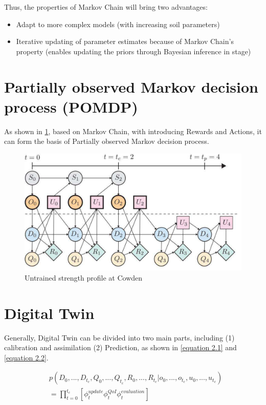   Thus, the properties of Markov Chain will bring two advantages: 

  \begin{itemize}
      \item Adapt to more complex models (with increasing soil parameters)
      \item Iterative updating of parameter estimates because of Markov Chain’s property (enables  updating the priors through Bayesian inference in stage)

  \end{itemize}


  \section{Partially observed Markov decision process (POMDP)}

As shown in \cref{fig:fig2.2}, based on Markov Chain, with introducing Rewards and Actions, it can form the basis of Partially observed Markov decision process.


\begin{figure}[htbp]
    \centering
    \includegraphics[width = 140mm]{Figures/figure3.pdf}
    \caption{Untrained strength profile at Cowden \protect\cite{kapteyn2021}}
    \label{fig:fig2.2}
\end{figure}


\section{Digital Twin}

Generally, Digital Twin can be divided into two main parts, including (1) calibration and assimilation (2) Prediction, as shown in \cref{equation 2.1}  and \cref{equation 2.2}.

\begin{equation}
\begin{aligned}
& p(D_{0},...,D_{t_{c}},Q_{0},...,Q_{t_{c}},R_{0},...,R_{t_{c}}|o_{0},...,o_{t_{c}},u_{0},...,u_{t_{c}}) \\
& = \prod_{t=0}^{t_{c}}[\phi_{t}^{update}\phi_{t}^{QoI}\phi_{t}^{evaluation}] \label{equation 2.1}
\end{aligned}
\end{equation}


